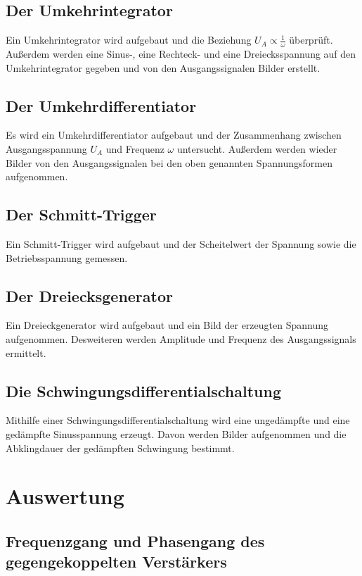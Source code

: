 \documentclass[]{scrartcl}
\let\oldsection\section
\renewcommand\section{\clearpage\oldsection}
\begin{document}
\subsection{Der Umkehrintegrator}
Ein Umkehrintegrator wird aufgebaut und die Beziehung $U_A\propto\frac{1}{\omega}$ überprüft. Außerdem werden eine Sinus-, eine Rechteck- und eine Dreiecksspannung auf den Umkehrintegrator gegeben und von den Ausgangssignalen Bilder erstellt.

\subsection{Der Umkehrdifferentiator}
Es wird ein Umkehrdifferentiator aufgebaut und der Zusammenhang zwischen Ausgangsspannung $U_A $ und Frequenz $\omega$ untersucht. Außerdem werden wieder Bilder von den Ausgangssignalen bei den oben genannten Spannungsformen aufgenommen.

\subsection{Der Schmitt-Trigger}
Ein Schmitt-Trigger wird aufgebaut und der Scheitelwert der Spannung sowie die Betriebsspannung gemessen.

\subsection{Der Dreiecksgenerator}
Ein Dreieckgenerator wird aufgebaut und ein Bild der erzeugten Spannung aufgenommen. Desweiteren werden Amplitude und Frequenz des Ausgangssignals ermittelt.

\subsection{Die Schwingungsdifferentialschaltung}
Mithilfe einer Schwingungsdifferentialschaltung wird eine ungedämpfte und eine gedämpfte Sinusspannung erzeugt. Davon werden Bilder aufgenommen und die Abklingdauer der gedämpften Schwingung bestimmt.

\section{Auswertung}

\subsection{Frequenzgang und Phasengang des gegengekoppelten Verstärkers}
\end{document}
